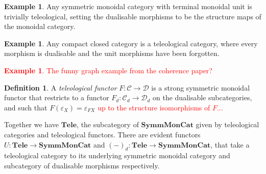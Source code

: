 \documentclass[11pt,a4paper]{article}
\theoremstyle{plain}
\theoremstyle{definition}
\newtheorem{definition}[theorem]{Definition}
\newtheorem{example}[theorem]{Example}
\newcommand{\C}{\mathscr{C}}
\newcommand{\D}{\mathscr{D}}
\newcommand{\SymmMonCat}{\mathbf{SymmMonCat}}
\newcommand{\Tele}{\mathbf{Tele}}
\newcommand{\todo}[1]{\textcolor{red}{\small #1}}
\begin{document}
\begin{example}
Any symmetric monoidal category with terminal monoidal unit is trivially teleological, setting the dualisable morphisms to be the structure maps of the monoidal category.
\end{example}

\begin{example}
Any compact closed category is a teleological category, where every morphism is dualisable and the unit morphisms have been forgotten.
\end{example}

\todo{\begin{example}
The funny graph example from the coherence paper?
\end{example}}

\begin{definition}
A \emph{teleological functor} $F : \C \to \D$ is a strong symmetric monoidal functor that restricts to a functor $F_d : \C_d \to \D_d$ on the dualisable subcategories, and such that $F(\varepsilon_X) = \varepsilon_{FX}$ \todo{up to the structure isomorphisms of $F$...}
\end{definition}

Together we have $\Tele$, the subcategory of $\SymmMonCat$ given by teleological categories and teleological functors. There are evident functors $U : \Tele \to \SymmMonCat$ and $(-)_d : \Tele \to \SymmMonCat$, that take a teleological category to its underlying symmetric monoidal category and subcategory of dualisable morphisms respectively.
\end{document}
